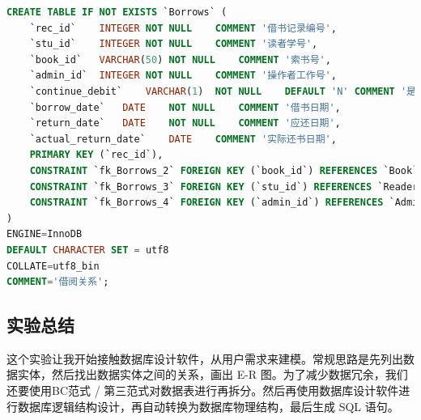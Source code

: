 \documentclass{article}
\begin{document}
\begin{lstlisting}[language=sql]
CREATE TABLE IF NOT EXISTS `Borrows` (
	`rec_id`	INTEGER	NOT NULL	COMMENT '借书记录编号',
	`stu_id`	INTEGER	NOT NULL	COMMENT '读者学号',
	`book_id`	VARCHAR(50)	NOT NULL	COMMENT '索书号',
	`admin_id`	INTEGER	NOT NULL	COMMENT '操作者工作号',
	`continue_debit`	VARCHAR(1)	NOT NULL	DEFAULT 'N'	COMMENT '是否续借',
	`borrow_date`	DATE	NOT NULL	COMMENT '借书日期',
	`return_date`	DATE	NOT NULL	COMMENT '应还日期',
	`actual_return_date`	DATE	COMMENT '实际还书日期',
	PRIMARY KEY (`rec_id`),
	CONSTRAINT `fk_Borrows_2` FOREIGN KEY (`book_id`) REFERENCES `Book`(`book_id`),
	CONSTRAINT `fk_Borrows_3` FOREIGN KEY (`stu_id`) REFERENCES `Reader`(`stu_id`),
	CONSTRAINT `fk_Borrows_4` FOREIGN KEY (`admin_id`) REFERENCES `Admin`(`admin_id`)
)
ENGINE=InnoDB
DEFAULT CHARACTER SET = utf8
COLLATE=utf8_bin
COMMENT='借阅关系';
\end{lstlisting}

\subsection{实验总结}

这个实验让我开始接触数据库设计软件，从用户需求来建模。常规思路是先列出数据实体，然后找出数据实体之间的关系，画出 E-R 图。为了减少数据冗余，我们还要使用BC范式 / 第三范式对数据表进行再拆分。然后再使用数据库设计软件进行数据库逻辑结构设计，再自动转换为数据库物理结构，最后生成 SQL 语句。
\end{document}
